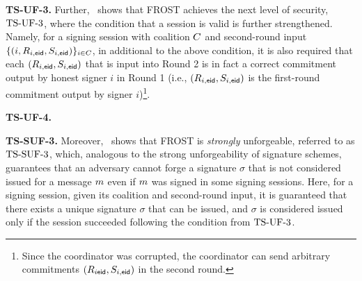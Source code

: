 \medskip

\textbf{TS-UF-3.} Further,~\cite{BellareCKMTZ22} shows that FROST achieves the next level of security, $\mathrm{TS}\mbox{-}\mathrm{UF}\mbox{-}{3}$, where the condition that a session is valid is further strengthened.
Namely, for a signing session with coalition $C$ and second-round  input $\{ (i, R_{i,\mathsf{eid}}, S_{i,\mathsf{eid}})\}_{i \in C}$,
in additional to the above condition, it is also required that each
$(R_{i,\mathsf{eid}}, S_{i,\mathsf{eid}})$ that is input into Round 2 is in fact a correct commitment output by honest signer $i$ in Round 1 (i.e., $(R_{i,\mathsf{eid}}, S_{i,\mathsf{eid}})$ is the first-round commitment output by signer $i$)\footnote{Since the coordinator was corrupted,  the coordinator can send arbitrary commitments $(R_{i\mathsf{eid}}, S_{i,\mathsf{eid}})$ in the second round.}.

\medskip

\textbf{TS-UF-4.}  

\medskip
\textbf{TS-SUF-3.} Moreover,~\cite{BellareCKMTZ22} shows that FROST is \emph{strongly} unforgeable, referred to as $\mathrm{TS}\mbox{-}\mathrm{SUF}\mbox{-}{3}$, which, analogous to the strong unforgeability of signature schemes, guarantees that an adversary cannot forge a signature $\sigma$ that is not considered issued for a message $m$ even if $m$ was signed in some signing sessions. Here, for a signing session, given its coalition and second-round input, it is guaranteed that there exists a unique signature $\sigma$ that can be issued, and $\sigma$ is considered issued only if the session succeeded following the condition from $\mathrm{TS}\mbox{-}\mathrm{UF}\mbox{-}{3}$.




